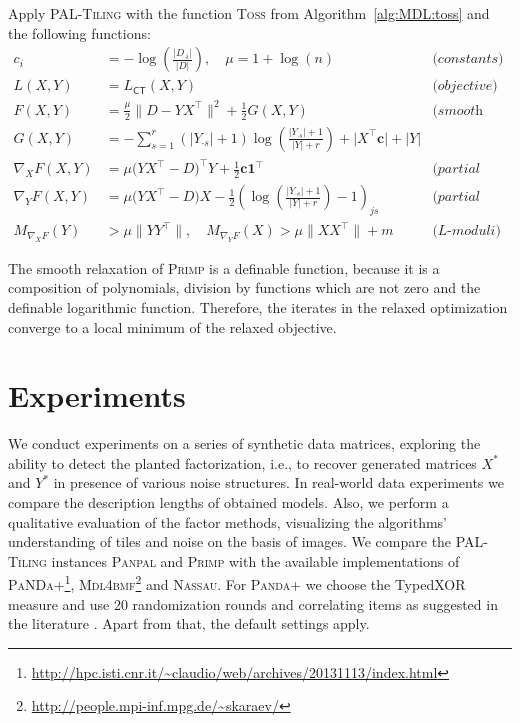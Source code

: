 \begin{algSpec}[Primp]\label{algSpec:Primp}
Apply \textsc{PAL-Tiling} with the function \textsc{Toss} from Algorithm~\ref{alg:MDL:toss} and the following functions:
\begin{align*}
    c_i&=-\log\left(\frac{\lvert D_{\cdot i}\rvert }{\lvert D\rvert }\right),\quad \mu= 1+\log(n) &\textit{(constants)}\\
    L(X,Y)&= L_{\mathsf{CT}}(X,Y) & \textit{(objective)}\\
    F(X,Y)&=\frac{\mu}{2}\bigl \lVert D-YX^\top \bigr \rVert ^2+ \frac{1}{2}G(X,Y) & \textit{(smooth part)}\\
    G(X,Y)&=-\sum_{s=1}^r(\lvert Y_{\cdot s}\rvert +1)\log\left(\frac{\lvert Y_{\cdot s}\rvert +1}{\lvert Y\rvert +r}\right) +\bigl \lvert X^\top \mathbf{c}\bigr \rvert  +\lvert Y\rvert &\\
    \nabla_XF(X,Y)&=\mu\bigl (YX^\top -D\bigr )^\top Y+\frac{1}{2}\mathbf{c}\mathbf{1}^\top  & \textit{(partial gradient X)}\\
    \nabla_YF(X,Y)&=\mu\bigl (YX^\top -D\bigr )X-\frac{1}{2}\left(\log\left(\frac{\lvert Y_{\cdot s}\rvert +1}{\lvert Y\rvert +r}\right)-1\right)_{js}& \textit{(partial gradient Y)}\\
    M_{\nabla_X F}(Y)&>\mu\bigl \lVert YY^\top \bigr \rVert ,\quad M_{\nabla_Y F}(X)>\mu\bigl \lVert XX^\top \bigr \rVert +m & \textit{(L-moduli)}
\end{align*}
\end{algSpec}
The smooth relaxation of \textsc{Primp} is a definable function, because it is a composition of polynomials, division by functions which are not zero and the definable logarithmic function. Therefore, the iterates in the relaxed optimization converge to a local minimum of the relaxed objective.
\section{Experiments}\label{sec:MDL:Experiments}
We conduct experiments on a series of synthetic data matrices, exploring the ability to detect the planted factorization, i.e., to recover generated matrices $X^*$ and $Y^*$ in presence of various noise structures. In real-world data experiments we compare the description lengths of obtained models. Also, we perform a qualitative evaluation of the factor methods, visualizing the algorithms' understanding of tiles and noise on the basis of images. We compare the \textsc{PAL-Tiling} instances \textsc{Panpal} and \textsc{Primp} with the available implementations of 
\textsc{PaNDa+}\footnote{\url{http://hpc.isti.cnr.it/~claudio/web/archives/20131113/index.html}}, \textsc{Mdl4bmf}\footnote{\label{note1}\url{http://people.mpi-inf.mpg.de/~skaraev/}} and \textsc{Nassau}. For \textsc{Panda+} we choose the TypedXOR measure and use 20 randomization rounds and correlating items as suggested in the literature \citep{lucchese2014unifying}. Apart from that, the default settings apply. 

